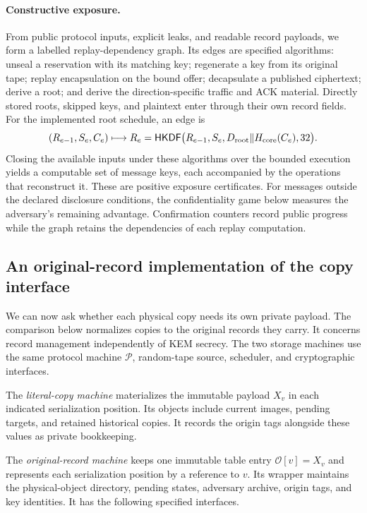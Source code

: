 \documentclass[pdflatex]{sn-jnl}
\theoremstyle{thmstyleone}
\theoremstyle{thmstylethree}
\theoremstyle{thmstyletwo}
\begin{document}
\paragraph{Constructive exposure.}
From public protocol inputs, explicit leaks, and readable record payloads, we
form a labelled replay-dependency graph.  Its edges are specified algorithms:
unseal a reservation with its matching key; regenerate a key from its original
tape; replay encapsulation on the bound offer; decapsulate a published
ciphertext; derive a root; and derive the direction-specific traffic and ACK
material.  Directly stored roots, skipped keys, and plaintext enter through
their own record fields.  For the implemented root schedule, an edge is
\[
 (R_{e-1},S_e,C_e)\longmapsto
 R_e=\mathsf{HKDF}\bigl(R_{e-1},S_e,
       D_{\rm root}\Vert H_{\rm core}(C_e),32\bigr).
\]
Closing the available inputs under these algorithms over the bounded
execution yields a computable set of message keys, each accompanied by the
operations that reconstruct it. These
are positive exposure certificates. For messages outside the declared
disclosure conditions, the confidentiality game below measures the adversary's
remaining advantage. Confirmation counters record public progress while the
graph retains the dependencies of each replay computation.

\subsection{An original-record implementation of the copy interface}

We can now ask whether each physical copy needs its own private payload.
The comparison below normalizes copies to the original records they
carry. It concerns record management independently of KEM secrecy.
The two storage machines use the same protocol machine
$\mathcal P$, random-tape source, scheduler, and cryptographic interfaces.

The \emph{literal-copy machine} materializes the immutable payload $X_v$ in
each indicated serialization position.  Its objects include current images,
pending targets, and retained historical copies.  It records the origin tags
alongside these values as private bookkeeping.

The \emph{original-record machine} keeps one immutable table entry
$\mathcal O[v]=X_v$ and represents each serialization position by a reference
to $v$.  Its wrapper maintains the physical-object directory, pending states,
adversary archive, origin tags, and key identities.  It has the following
specified interfaces.
\end{document}
